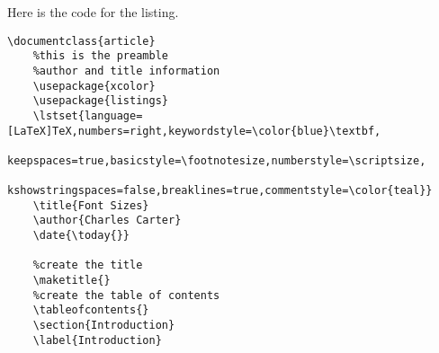         
Here is the code for the listing.

\begin{verbatim}
\documentclass{article}
    %this is the preamble
    %author and title information
    \usepackage{xcolor}
    \usepackage{listings}
    \lstset{language=[LaTeX]TeX,numbers=right,keywordstyle=\color{blue}\textbf,
        keepspaces=true,basicstyle=\footnotesize,numberstyle=\scriptsize,
        kshowstringspaces=false,breaklines=true,commentstyle=\color{teal}}
    \title{Font Sizes}
    \author{Charles Carter}
    \date{\today{}}
 
    %create the title
    \maketitle{}
    %create the table of contents
    \tableofcontents{}
    \section{Introduction}
    \label{Introduction}

\end{verbatim}
